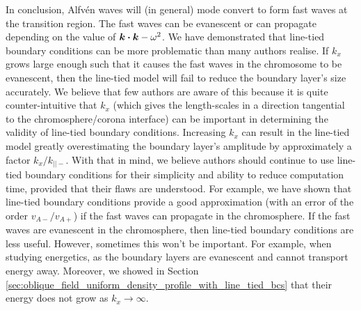 In conclusion, Alfv\'en waves will (in general) mode convert to form fast waves at the transition region. The fast waves can be evanescent or can propagate depending on the value of $\vec{k}\vdot\vec{k} - \omega^2$. We have demonstrated that line-tied boundary conditions can be more problematic than many authors realise. If $k_x$ grows large enough such that it causes the fast waves in the chromosome to be evanescent, then the line-tied model will fail to reduce the boundary layer's size accurately. We believe that few authors are aware of this because it is quite counter-intuitive that $k_x$ (which gives the length-scales in a direction tangential to the chromosphere/corona interface) can be important in determining the validity of line-tied boundary conditions. Increasing $k_x$ can result in the line-tied model greatly overestimating the boundary layer's amplitude by approximately a factor $k_x / k_{||-}$. With that in mind, we believe authors should continue to use line-tied boundary conditions for their simplicity and ability to reduce computation time, provided that their flaws are understood. For example, we have shown that line-tied boundary conditions provide a good approximation (with an error of the order $v_{A-}/v_{A+}$) if the fast waves can propagate in the chromosphere. If the fast waves are evanescent in the chromosphere, then line-tied boundary conditions are less useful. However, sometimes this won't be important. For example, when studying energetics, as the boundary layers are evanescent and cannot transport energy away. Moreover, we showed in Section \ref{sec:oblique_field_uniform_density_profile_with_line_tied_bcs} that their energy does not grow as $k_x\rightarrow \infty$.

